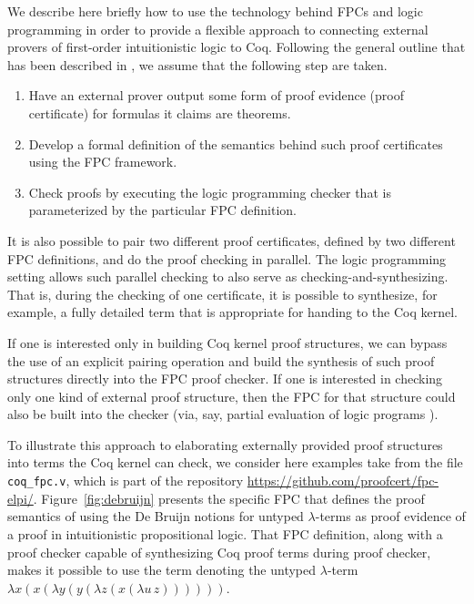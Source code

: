 We describe here briefly how to use the technology behind FPCs and
logic programming in order to provide a flexible approach to
connecting external provers of first-order intuitionistic logic to
Coq.
%
Following the general outline that has been described in
\cite{blanco17cade}, we assume that the following step are taken.
%
\begin{enumerate}
\item Have an external prover output some form of proof evidence
  (proof certificate) for formulas it claims are theorems.

\item Develop a formal definition of the semantics behind such proof
  certificates using the FPC framework.

\item Check proofs by executing the logic programming checker that is
  parameterized by the particular FPC definition.
\end{enumerate}
%
It is also possible to pair two different proof certificates, defined
by two different FPC definitions, and do the proof checking in
parallel.  The logic programming setting allows such parallel checking
to also serve as checking-and-synthesizing.  That is, during the
checking of one certificate, it is possible to synthesize, for
example, a fully detailed term that is appropriate for handing to the
Coq kernel.

If one is interested only in building Coq kernel proof structures, we
can bypass the use of an explicit pairing operation and build the
synthesis of such proof structures directly into the FPC proof
checker.  If one is interested in checking only one kind of external
proof structure, then the FPC for that structure could also be built
into the checker (via, say, partial evaluation of logic programs
\cite{lloyd91jlp}).

To illustrate this approach to elaborating externally provided proof
structures into terms the Coq kernel can check, we consider here
examples take from the file \verb+coq_fpc.v+, which is part of the
repository \url{https://github.com/proofcert/fpc-elpi/}.
Figure~\ref{fig:debruijn} presents the specific FPC that defines the
proof semantics of using the De Bruijn notions for untyped
$\lambda$-terms as proof evidence of a proof in intuitionistic
propositional logic.  That FPC definition, along with a proof checker
capable of synthesizing Coq proof terms during proof checker, makes it
possible to use the term denoting the untyped $\lambda$-term
$\lambda x (x (\lambda y (y (\lambda z (x (\lambda u\,z))))))$.

